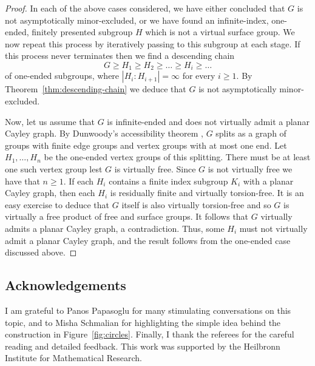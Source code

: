 \documentclass[10pt,a4paper]{amsart}
\theoremstyle{definition}
\begin{document}
\begin{proof}
    In each of the above cases considered, we have either concluded that $G$ is not asymptotically minor-excluded, or we have found an infinite-index, one-ended, finitely presented subgroup $H$ which is not a virtual surface group. We now repeat this process by iteratively passing to this subgroup at each stage. If this process never terminates then we find a descending chain 
    $$
    G \geq H_1 \geq H_{2} \geq \ldots \geq H_i \geq \ldots
    $$
    of one-ended subgroups, where $|H_i : H_{i+1}| = \infty$ for every $i \geq 1$. By Theorem~\ref{thm:descending-chain} we deduce that $G$ is not asymptotically minor-excluded. 

    Now, let us assume that $G$ is infinite-ended and does not virtually admit a planar Cayley graph.  
    By Dunwoody's accessibility theorem \cite{dunwoody1985accessibility}, $G$ splits as a graph of groups with finite edge groups and vertex groups with at most one end. Let $H_1, \ldots, H_n$ be the one-ended vertex groups of this splitting. There must be at least one such vertex group lest $G$ is virtually free. Since $G$ is not virtually free we have that $n \geq 1$. 
    If each $H_i$ contains a finite index subgroup $K_i$ with a planar Cayley graph, then each $H_i$ is residually finite and virtually torsion-free. It is an easy exercise to deduce that $G$ itself is also virtually torsion-free and so $G$ is virtually a free product of free and surface groups. It follows that $G$ virtually admits a planar Cayley graph, a contradiction. Thus, some $H_i$ must not virtually admit a planar Cayley graph, and the result follows from the one-ended case discussed above. 
\end{proof}


\subsection*{Acknowledgements}

I am grateful to Panos Papasoglu for many stimulating conversations on this topic, and to Misha Schmalian for highlighting the simple idea behind the construction in Figure~\ref{fig:circles}. Finally, I thank the referees for the careful reading and detailed feedback. This work was supported by the Heilbronn Institute for Mathematical Research.






\end{document}
